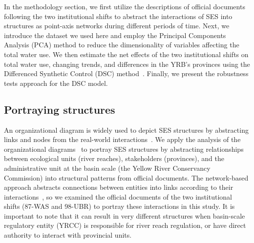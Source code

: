 
In the methodology section, we first utilize the descriptions of official documents following the two institutional shifts to abstract the interactions of SES into structures as point-axis networks during different periods of time.
Next, we introduce the dataset we used here and employ the Principal Components Analysis (PCA) method to reduce the dimensionality of variables affecting the total water use.
We then estimate the net effects of the two institutional shifts on total water use, changing trends, and differences in the YRB's provinces using the Differenced Synthetic Control (DSC) method~\cite{arkhangelsky2021}.
Finally, we present the robustness tests approach for the DSC model.

\subsection{Portraying structures}\label{sec:structures}

An organizational diagram is widely used to depict SES structures by abstracting links and nodes from the real-world interactions~\cite{wang2022g,bodin2017a,kluger2020,guerrero2015}.
We apply the analysis of the organizational diagrams~\cite{bodin2017b} to portray SES structures by abstracting relationships between ecological units (river reaches), stakeholders (provinces), and the administrative unit at the basin scale (the Yellow River Conservancy Commission) into structural patterns from official documents.
The network-based approach abstracts connections between entities into links according to their interactions~\cite{bodin2017a,kluger2020,guerrero2015}, so we examined the official documents of the two institutional shifts (87-WAS and 98-UBR) to portray these interactions in this study.
It is important to note that it can result in very different structures when basin-scale regulatory entity (YRCC) is responsible for river reach regulation, or have direct authority to interact with provincial units.

